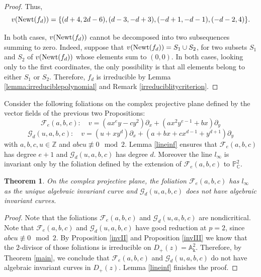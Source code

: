 \documentclass[reqno,oneside,11pt]{amsart}
\newtheorem{thm}{Theorem}[section]
\theoremstyle{definition}
\DeclareMathOperator{\field}{k}
\begin{document}
\begin{proof}

Thus,
\[v({\rm Newt}(f_d)) = \{(d+4, 2d-6), (d-3, -d+3), (-d+1,-d-1), (-d-2,4)\}.\]

In both cases, $v({\rm Newt}(f_d))$ cannot be decomposed into two subsequences summing to zero. Indeed, suppose that $v({\rm Newt}(f_d)) = S_1 \cup S_2$, for two subsets $S_1$ and $S_2$ of $v({\rm Newt}(f_d))$ whose elements sum to $(0,0)$. In both cases, looking only to the first coordinates, the only possibility is that all elements belong to either $S_1$ or $S_2$. Therefore, $f_d$ is irreducible by Lemma \ref{lemma:irreduciblepolynomial} and Remark \ref{irreduciblitycriterion}.
\end{proof}

Consider the following foliations on the complex projective plane defined by the vector fields of the previous two Propositions: 
$$
    \mathcal{F}_e(a,b,c)\colon \quad v = (ax^{e}y-cy^{2})\partial_{x}+(ax^{2}y^{e-1}+bx)\partial_{y}
$$  
$$
    \mathcal{G}_d(u,a,b,c)\colon \quad v = (u+xy^{d})\partial_x+(a+bx+cx^{d-1}+y^{d+1})\partial_{y}
$$
with $a,b,c,u \in \mathbb{Z}$ and $abcu \not\equiv 0 \mod 2$. Lemma \ref{lineinf} ensures that $\mathcal{F}_e(a,b,c)$ has degree $e+1$ and $\mathcal{G}_d(u,a,b,c)$ has degree $d$. Moreover the line $l_{\infty}$ is invariant only by the foliation defined by the extension of $\mathcal{F}_e(a,b,c)$  to $\mathbb{P}_{\mathbb{C}}^{2}$.


\begin{thm} \label{thm:examples} On the complex projective plane, the foliation $\mathcal{F}_e(a,b,c)$ has $l_{\infty}$ as the unique algebraic invariant curve and $\mathcal{G}_d(u,a,b,c)$ does not have algebraic invariant curves.
\end{thm}
\begin{proof} Note that the foliations $\mathcal{F}_e(a,b,c)$ and $\mathcal{G}_d(u,a,b,c)$ are nondicritical. Note that  $\mathcal{F}_e(a,b,c)$ and $\mathcal{G}_d(u, a,b,c)$ have good reduction at $ p =2 $, since $abcu \not\equiv 0 \mod 2$. By Proposition \ref{invII} and Proposition \ref{invIII} we know that the $2$-divisor of those foliations is irreducible on $D_{+}(z) = \mathbb{A}_{\field}^{2}$. Therefore, by Theorem \ref{main}, we conclude that $\mathcal{F}_e(a,b,c)$ and $\mathcal{G}_d(u, a,b,c)$ do not have algebraic invariant curves in $D_{+}(z)$. Lemma \ref{lineinf} finishes the proof.
\end{proof}
\end{document}
